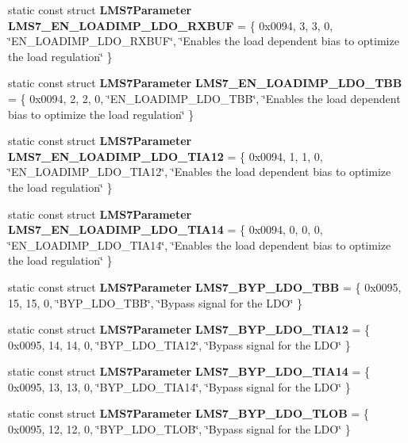 \begin{DoxyCompactItemize}
\item 
static const struct {\bf L\+M\+S7\+Parameter} {\bf L\+M\+S7\+\_\+\+E\+N\+\_\+\+L\+O\+A\+D\+I\+M\+P\+\_\+\+L\+D\+O\+\_\+\+R\+X\+B\+UF} = \{ 0x0094, 3, 3, 0, \char`\"{}\+E\+N\+\_\+\+L\+O\+A\+D\+I\+M\+P\+\_\+\+L\+D\+O\+\_\+\+R\+X\+B\+U\+F\char`\"{}, \char`\"{}\+Enables the load dependent bias to optimize the load regulation\char`\"{} \}
\item 
static const struct {\bf L\+M\+S7\+Parameter} {\bf L\+M\+S7\+\_\+\+E\+N\+\_\+\+L\+O\+A\+D\+I\+M\+P\+\_\+\+L\+D\+O\+\_\+\+T\+BB} = \{ 0x0094, 2, 2, 0, \char`\"{}\+E\+N\+\_\+\+L\+O\+A\+D\+I\+M\+P\+\_\+\+L\+D\+O\+\_\+\+T\+B\+B\char`\"{}, \char`\"{}\+Enables the load dependent bias to optimize the load regulation\char`\"{} \}
\item 
static const struct {\bf L\+M\+S7\+Parameter} {\bf L\+M\+S7\+\_\+\+E\+N\+\_\+\+L\+O\+A\+D\+I\+M\+P\+\_\+\+L\+D\+O\+\_\+\+T\+I\+A12} = \{ 0x0094, 1, 1, 0, \char`\"{}\+E\+N\+\_\+\+L\+O\+A\+D\+I\+M\+P\+\_\+\+L\+D\+O\+\_\+\+T\+I\+A12\char`\"{}, \char`\"{}\+Enables the load dependent bias to optimize the load regulation\char`\"{} \}
\item 
static const struct {\bf L\+M\+S7\+Parameter} {\bf L\+M\+S7\+\_\+\+E\+N\+\_\+\+L\+O\+A\+D\+I\+M\+P\+\_\+\+L\+D\+O\+\_\+\+T\+I\+A14} = \{ 0x0094, 0, 0, 0, \char`\"{}\+E\+N\+\_\+\+L\+O\+A\+D\+I\+M\+P\+\_\+\+L\+D\+O\+\_\+\+T\+I\+A14\char`\"{}, \char`\"{}\+Enables the load dependent bias to optimize the load regulation\char`\"{} \}
\item 
static const struct {\bf L\+M\+S7\+Parameter} {\bf L\+M\+S7\+\_\+\+B\+Y\+P\+\_\+\+L\+D\+O\+\_\+\+T\+BB} = \{ 0x0095, 15, 15, 0, \char`\"{}\+B\+Y\+P\+\_\+\+L\+D\+O\+\_\+\+T\+B\+B\char`\"{}, \char`\"{}\+Bypass signal for the L\+D\+O\char`\"{} \}
\item 
static const struct {\bf L\+M\+S7\+Parameter} {\bf L\+M\+S7\+\_\+\+B\+Y\+P\+\_\+\+L\+D\+O\+\_\+\+T\+I\+A12} = \{ 0x0095, 14, 14, 0, \char`\"{}\+B\+Y\+P\+\_\+\+L\+D\+O\+\_\+\+T\+I\+A12\char`\"{}, \char`\"{}\+Bypass signal for the L\+D\+O\char`\"{} \}
\item 
static const struct {\bf L\+M\+S7\+Parameter} {\bf L\+M\+S7\+\_\+\+B\+Y\+P\+\_\+\+L\+D\+O\+\_\+\+T\+I\+A14} = \{ 0x0095, 13, 13, 0, \char`\"{}\+B\+Y\+P\+\_\+\+L\+D\+O\+\_\+\+T\+I\+A14\char`\"{}, \char`\"{}\+Bypass signal for the L\+D\+O\char`\"{} \}
\item 
static const struct {\bf L\+M\+S7\+Parameter} {\bf L\+M\+S7\+\_\+\+B\+Y\+P\+\_\+\+L\+D\+O\+\_\+\+T\+L\+OB} = \{ 0x0095, 12, 12, 0, \char`\"{}\+B\+Y\+P\+\_\+\+L\+D\+O\+\_\+\+T\+L\+O\+B\char`\"{}, \char`\"{}\+Bypass signal for the L\+D\+O\char`\"{} \}

\end{DoxyCompactItemize}

